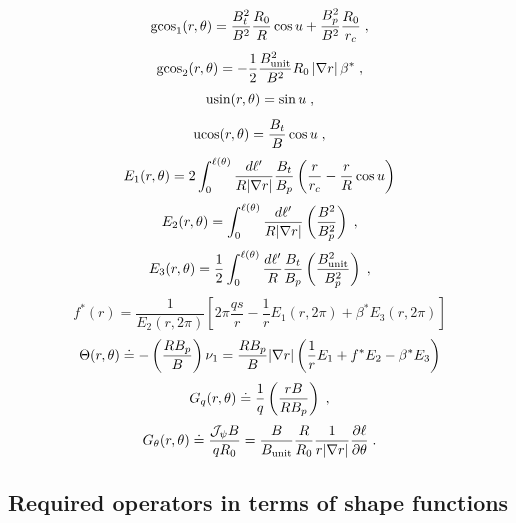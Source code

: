 %
\begin{equation}
\text{gcos}_1(r,\theta) = \frac{B_t^2}{B^2}\frac{R_0}{R} \cos u +
\frac{B_p^2}{B^2}\frac{R_0}{r_c} \; ,
\end{equation}
%
\begin{equation}
\text{gcos}_2(r,\theta) = -\frac{1}{2}\frac{B_{\rm unit}^2}{B^2} R_0 
 \, |\nabla r| \, \beta^* \; ,
\end{equation}
%
\begin{equation}
\text{usin}(r,\theta) = \sin u \; ,
\end{equation}
%
\begin{equation}
\text{ucos}(r,\theta) = \frac{B_t}{B} \cos u \; ,
\end{equation}
%
\begin{equation}
E_1(r,\theta) = 2 \int_0^{\ell(\theta)} \frac{d\ell^\prime}{R |\nabla r|} \frac{B_t}{B_p} 
\left( \frac{r}{r_c} - \frac{r}{R} \cos u \right)
\end{equation}
%
\begin{equation}
E_2(r,\theta) = \int_0^{\ell(\theta)} \frac{d\ell^\prime}{R |\nabla r|} \left( 
\frac{B^2}{B_p^2} \right) \; ,
\end{equation}
%
\begin{equation}
E_3(r,\theta) = \frac{1}{2} \int_0^{\ell(\theta)} 
 \frac{d\ell^\prime}{R} \frac{B_t}{B_p} \left( 
 \frac{B_{\rm unit}^2}{B_p^2} \right) \; ,
\end{equation}
%
\begin{equation}
f^*(r) = \frac{1}{E_2(r,2\pi)} \left[ 2\pi \frac{q s}{r} - 
\frac{1}{r} E_1(r,2\pi) + \beta^*E_3(r,2\pi) \right] 
\end{equation}
%
\begin{equation}
\Theta(r,\theta) \doteq -\left( \frac{R B_p}{B} \right) \nu_1 
= \frac{R B_p}{B} |\nabla r| 
\left( \frac{1}{r} E_1 + f^* E_2 - \beta^* E_3 \right) 
\end{equation}
%
\begin{equation}
G_q(r,\theta) \doteq \frac{1}{q} \left(\frac{rB}{R B_p}\right) \; ,
\end{equation}
%
\begin{equation}
G_\theta(r,\theta) \doteq \frac{{\mathcal J}_\psi B}{q R_0} 
 = \frac{B}{B_{\rm unit}}\frac{R}{R_0} \frac{1}{r|\nabla r|} 
   \frac{\partial\ell}{\partial\theta} \; . 
\end{equation}

\subsection{Required operators in terms of shape functions}
\label{sec.shapefun}

